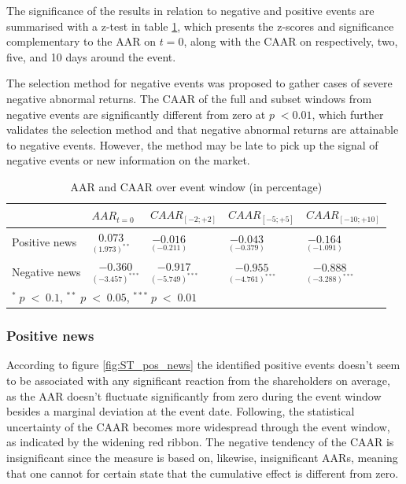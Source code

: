 The significance of the results in relation to negative and positive events are summarised with a z-test in table \ref{tab: ST_significace}, which presents the z-scores and significance complementary to the AAR on $t=0$, along with the CAAR on respectively, two, five, and 10 days around the event.  



The selection method for negative events was proposed to gather cases of severe negative abnormal returns. The CAAR of the full and subset windows from negative events are significantly different from zero at $p \; < 0.01$, which further validates the selection method and that negative abnormal returns are attainable to negative events. However, the method may be late to pick up the signal of negative events or new information on the market.  

\begin{table}[ht]
\centering
\caption{AAR and CAAR over event window (in percentage)} 
\begin{tabular}{lllll}
   \hline  \hline
  & $AAR_{t=0}$ & $CAAR_{[-2;+2]}$ & $CAAR_{[-5;+5]}$ & $CAAR_{[-10;+10]}$  \\
 \hline
Positive news & $\underset{(1.973)^{**}}{0.073}$  & $\underset{(-0.211)}{-0.016}$    & $\underset{(-0.379)}{-0.043}$ & $\underset{(-1.091)}{-0.164}$  \\ 
Negative news & $\underset{(-3.457)^{***}}{-0.360}$  & $\underset{(-5.749)^{***}}{-0.917}$    & $\underset{(-4.761)^{***}}{-0.955}$ & $\underset{(-3.288)^{***}}{-0.888}$  \\ 
   \hline
   \multicolumn{5}{p{12cm}}{\footnotesize  $^* \; p\; <\; 0.1$, $ ^{**} \; p\; <\; 0.05$, $ ^{***} \; p\; <\; 0.01$  } \\ 
\end{tabular}
\label{tab: ST_significace}
\end{table}

\subsubsection{Positive news}

According to figure \ref{fig:ST_pos_news} the identified positive events doesn't seem to be associated with any significant reaction from the shareholders on average, as the AAR doesn't fluctuate significantly from zero during the event window besides a marginal deviation at the event date. Following, the statistical uncertainty of the CAAR becomes more widespread through the event window, as indicated by the widening red ribbon. The negative tendency of the CAAR is insignificant since the measure is based on, likewise, insignificant AARs, meaning that one cannot for certain state that the cumulative effect is different from zero. 

